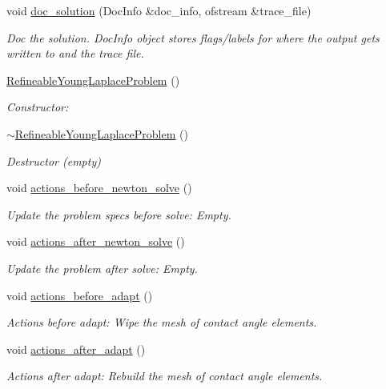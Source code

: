 \begin{DoxyCompactItemize}
void \hyperlink{classRefineableYoungLaplaceProblem_a4ec7313c8e4015b0c2af0bbef789e70f}{doc\+\_\+solution} (Doc\+Info \&doc\+\_\+info, ofstream \&trace\+\_\+file)
\begin{DoxyCompactList}\small\item\em Doc the solution. Doc\+Info object stores flags/labels for where the output gets written to and the trace file. \end{DoxyCompactList}\item 
\hyperlink{classRefineableYoungLaplaceProblem_a78f77a299f2770a82378fcccf86a0b71}{Refineable\+Young\+Laplace\+Problem} ()
\begin{DoxyCompactList}\small\item\em Constructor\+: \end{DoxyCompactList}\item 
\hyperlink{classRefineableYoungLaplaceProblem_a24b45d5ecdd1d7dbb678e7f74777bf41}{$\sim$\+Refineable\+Young\+Laplace\+Problem} ()
\begin{DoxyCompactList}\small\item\em Destructor (empty) \end{DoxyCompactList}\item 
void \hyperlink{classRefineableYoungLaplaceProblem_a2807bb8cddbfa553df9f5dd170c8645d}{actions\+\_\+before\+\_\+newton\+\_\+solve} ()
\begin{DoxyCompactList}\small\item\em Update the problem specs before solve\+: Empty. \end{DoxyCompactList}\item 
void \hyperlink{classRefineableYoungLaplaceProblem_a0791c90a16016372e09faf3f5721ecbe}{actions\+\_\+after\+\_\+newton\+\_\+solve} ()
\begin{DoxyCompactList}\small\item\em Update the problem after solve\+: Empty. \end{DoxyCompactList}\item 
void \hyperlink{classRefineableYoungLaplaceProblem_ab64eb0b58beb3bb096ecc81b1a3f8a4f}{actions\+\_\+before\+\_\+adapt} ()
\begin{DoxyCompactList}\small\item\em Actions before adapt\+: Wipe the mesh of contact angle elements. \end{DoxyCompactList}\item 
void \hyperlink{classRefineableYoungLaplaceProblem_aa2eab8da1b83091df804ede7c60fac87}{actions\+\_\+after\+\_\+adapt} ()
\begin{DoxyCompactList}\small\item\em Actions after adapt\+: Rebuild the mesh of contact angle elements. \end{DoxyCompactList}\item 

\end{DoxyCompactItemize}
